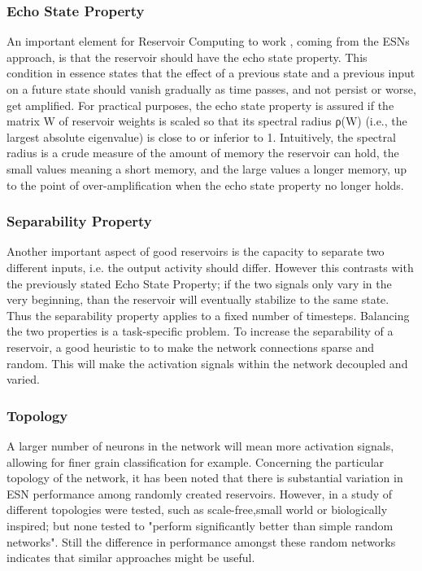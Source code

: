 \documentclass[12pt,oneside]{CUNY_CS_PhD}
\begin{document}
\subsubsection{Echo State Property}
An important element for Reservoir Computing to work , coming from the ESNs approach, is that the reservoir should have the echo state property. This condition in essence states that the effect of a previous state and a previous input on a future state should vanish gradually as time passes, and not persist or worse, get amplified. For practical purposes, the echo state property is assured if the matrix W of reservoir weights is scaled so that its spectral radius
ρ(W) (i.e., the largest absolute eigenvalue) is close to or inferior to 1. Intuitively, the spectral radius is a crude measure of the amount of memory the reservoir can hold, the small values meaning a short memory, and the large values a longer memory, up to the point of over-amplification when the echo state property no longer holds.

\subsubsection{Separability Property}
Another important aspect of good reservoirs is the capacity to separate two different inputs, i.e. the output activity should differ.
 However this contrasts with the previously stated Echo State Property; if the two signals only vary in the very beginning, than the reservoir will eventually stabilize to the same state. Thus the separability property applies to a fixed number of timesteps. Balancing the two properties is a task-specific problem. To increase the separability of a reservoir, a good heuristic to to make the network connections sparse and random.  %
This will  make the activation signals within the network decoupled and varied.

\subsubsection{Topology}
\label{topo}
A larger number of neurons in the network will mean more activation signals, allowing for finer grain classification for example. Concerning the particular topology of the network, it has been noted that there is substantial variation in ESN performance among randomly created reservoirs. However, in a study of different topologies were tested,%
 such as scale-free,small world or biologically inspired; but none tested to "perform significantly better than simple random networks". Still the difference in performance amongst these random networks indicates that similar approaches might be useful.%
\end{document}
